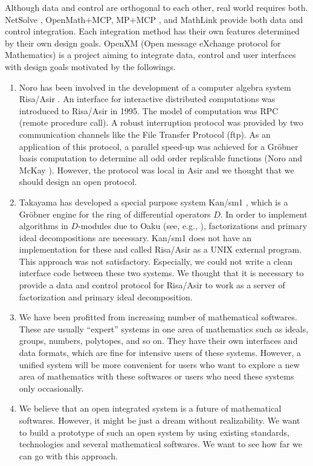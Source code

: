 Although data and control are orthogonal to each other,
real world requires both.
NetSolve \cite{netsolve}, OpenMath$+$MCP, MP$+$MCP \cite{iamc},
and MathLink \cite{mathlink} provide both data and control integration.
Each integration method has their own features determined by their
own design goals.
OpenXM (Open message eXchange protocol for Mathematics)
is a project aiming to integrate data, control and user interfaces
with design goals motivated by the followings.
\begin{enumerate}
\item Noro has been involved in the development of 
a computer algebra system Risa/Asir \cite{asir}.
An interface for interactive distributed computations was introduced
to Risa/Asir 
in 1995.
The model of computation was RPC (remote procedure call).
A robust interruption protocol was provided 
by  two communication channels
like the File Transfer Protocol (ftp).
As an application of this protocol,
a parallel speed-up was achieved for a Gr\"obner basis computation
to determine all odd order replicable functions 
(Noro and McKay \cite{noro-mckay}).
However, the protocol was local in Asir and we thought that we should
design an open protocol.
\item Takayama has developed
a special purpose system Kan/sm1 \cite{kan},
which is a Gr\"obner engine for the ring of differential operators $D$. 
In order to implement algorithms in $D$-modules due to Oaku 
(see, e.g., \cite{sst-book}),
factorizations and primary ideal decompositions are necessary.
Kan/sm1 does not have an implementation for these and called
Risa/Asir as a UNIX external program.
This approach was not satisfactory.
Especially, we could not write a clean interface code between these
two systems.
We thought that it is necessary to provide a data and control protocol
for Risa/Asir to work as a server of factorization and primary ideal
decomposition.
\item We have been profitted from increasing number 
of mathematical softwares.
These are usually ``expert'' systems in one area of mathematics
such as ideals, groups, numbers, polytopes, and so on.
They have their own interfaces and data formats,
which are fine for intensive users of these systems.
However, a unified system will be more convenient
for users who want to explore a new area of mathematics with these
softwares or users who need these systems only occasionally.

\item  We believe that an open integrated system is a future of mathematical
softwares.
However, it might be just a dream without realizability.
We want to build a prototype of such an open system by using
existing standards, technologies and several mathematical softwares.
We want to see how far we can go with this approach.
\end{enumerate}

